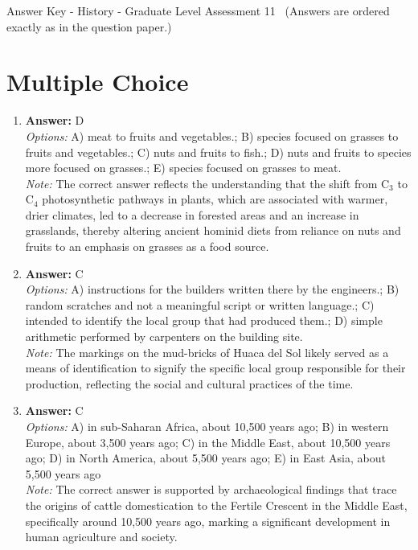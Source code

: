 \documentclass[12pt]{article}
\begin{document}
\begin{center}
Answer Key - History - Graduate Level Assessment 11 \
\small (Answers are ordered exactly as in the question paper.)
\end{center}

\section*{Multiple Choice}
\begin{enumerate}[label=\arabic*.]
\item \textbf{Answer:} D
\\ \textit{Options:} A) meat to fruits and vegetables.; B) species focused on grasses to fruits and vegetables.; C) nuts and fruits to fish.; D) nuts and fruits to species more focused on grasses.; E) species focused on grasses to meat.
\\ \textit{Note:} The correct answer reflects the understanding that the shift from C$_{3}$ to C$_{4}$ photosynthetic pathways in plants, which are associated with warmer, drier climates, led to a decrease in forested areas and an increase in grasslands, thereby altering ancient hominid diets from reliance on nuts and fruits to an emphasis on grasses as a food source.
\item \textbf{Answer:} C
\\ \textit{Options:} A) instructions for the builders written there by the engineers.; B) random scratches and not a meaningful script or written language.; C) intended to identify the local group that had produced them.; D) simple arithmetic performed by carpenters on the building site.
\\ \textit{Note:} The markings on the mud-bricks of Huaca del Sol likely served as a means of identification to signify the specific local group responsible for their production, reflecting the social and cultural practices of the time.
\item \textbf{Answer:} C
\\ \textit{Options:} A) in sub-Saharan Africa, about 10,500 years ago; B) in western Europe, about 3,500 years ago; C) in the Middle East, about 10,500 years ago; D) in North America, about 5,500 years ago; E) in East Asia, about 5,500 years ago
\\ \textit{Note:} The correct answer is supported by archaeological findings that trace the origins of cattle domestication to the Fertile Crescent in the Middle East, specifically around 10,500 years ago, marking a significant development in human agriculture and society.

\end{enumerate}
\end{document}

